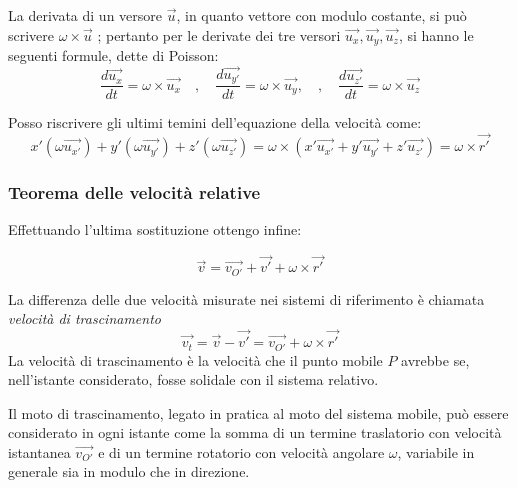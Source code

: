 \documentclass[class=book, crop=false, oneside, 12pt]{standalone}
\begin{document}
La derivata di un versore \(\overrightarrow{u}\), in quanto vettore con modulo costante, si può scrivere \(\omega \times \overrightarrow{u}\) ; pertanto per le derivate dei tre versori \(\overrightarrow{u_x},\overrightarrow{u_y},\overrightarrow{u_z}\), si hanno le seguenti formule, dette di Poisson:
\begin{equation}
    \frac{d \overrightarrow{u_{x}}}{d t}=\omega \times \overrightarrow{u_{x}} \quad, \quad \frac{d \overrightarrow{u_{y'}}}{d t}=\omega \times \overrightarrow{u_{y}}, \quad, \quad \frac{d \overrightarrow{u_{z'}}}{d t}=\omega \times \overrightarrow{u_{z}}
\end{equation} 

Posso riscrivere gli ultimi temini dell'equazione della velocità come:
\begin{equation}
    x' (\omega \overrightarrow{u_{x'}}) + y' (\omega \overrightarrow{u_{y'}}) + z' (\omega \overrightarrow{u_{z'}}) = \omega \times (x' \overrightarrow{u_{x'}} + y' \overrightarrow{u_{y'}} + z' \overrightarrow{u_{z'}}) = \omega \times \overrightarrow{r'}
\end{equation}

\subsubsection{Teorema delle velocità relative}
Effettuando l'ultima sostituzione ottengo infine:

\begin{equation}
    \overrightarrow{v} = \overrightarrow{v_{O'}} + \overrightarrow{v'} + \omega \times \overrightarrow{r'}
\end{equation}

La differenza delle due velocità misurate nei sistemi di riferimento è chiamata \emph{velocità di trascinamento}
\begin{equation*}
    \overrightarrow{v_t} = \overrightarrow{v} - \overrightarrow{v'} = \overrightarrow{v_{O'}} + \omega \times \overrightarrow{r'}
\end{equation*}
La velocità di trascinamento è la velocità che il punto mobile \(P\) avrebbe se, nell’istante considerato, fosse solidale con il sistema relativo.

Il moto di trascinamento, legato in pratica al moto del sistema mobile, può essere considerato in ogni istante come la somma di un termine traslatorio con velocità istantanea \(\overrightarrow{v_{O'}}\) e di un termine rotatorio con velocità angolare \(\omega\), variabile in generale sia in modulo che in direzione.
\end{document}
